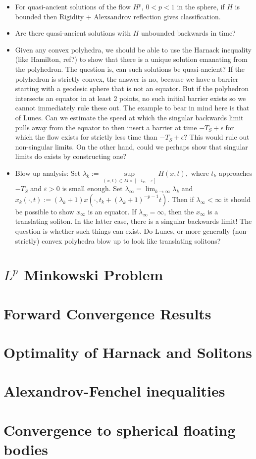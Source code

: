 \documentclass{amsart}
\begin{document}
\begin{itemize}
\item For quasi-ancient solutions of the flow $H^p$, $0<p<1$ in the sphere, if $H$ is bounded then Rigidity + Alexsandrov reflection gives classification.
\item Are there quasi-ancient solutions with $H$ unbounded backwards in time?
\item Given any convex polyhedra, we should be able to use the Harnack inequality (like Hamilton, ref?) to show that there is a unique solution emanating from the polyhedron. The question is, can such solutions be quasi-ancient? If the polyhedron is strictly convex, the answer is no, because we have a barrier starting with a geodesic sphere that is not an equator. But if the polyhedron intersects an equator in at least 2 points, no such initial barrier exists so we cannot immediately rule these out. The example to bear in mind here is that of Lunes. Can we estimate the speed at which the singular backwards limit pulls away from the equator to then insert a barrier at time $-T_S + \epsilon$ for which the flow exists for strictly less time than $-T_S + \epsilon$? This would rule out non-singular limits. On the other hand, could we perhaps show that singular limits do exists by constructing one?
\item Blow up analysis: Set $\lambda_k := \sup\limits_{(x,t)\in M\times [-t_k,-\varepsilon]} H(x,t),$ where $t_k$ approaches $-T_S$ and $\varepsilon>0$ is small enough. Set $\lambda_{\infty}=\lim_{k\to\infty}\lambda_k$ and $x_k(\cdot,t):=(\lambda_k+1)x(\cdot, t_k+(\lambda_k+1)^{-p-1}t)$. Then if $\lambda_{\infty} < \infty$ it should be possible to show $x_{\infty}$ is an equator. If $\lambda_{\infty} = \infty$, then the $x_{\infty}$ is a translating soliton. In the latter case, there is a singular backwards limit! The question is whether such things can exist. Do Lunes, or more generally (non-strictly) convex polyhedra blow up to look like translating solitons?
\end{itemize}

\section{$L^p$ Minkowski Problem}

\section{Forward Convergence Results}

\section{Optimality of Harnack and Solitons}

\section{Alexandrov-Fenchel inequalities}

\section{Convergence to spherical floating bodies}





\end{document}
